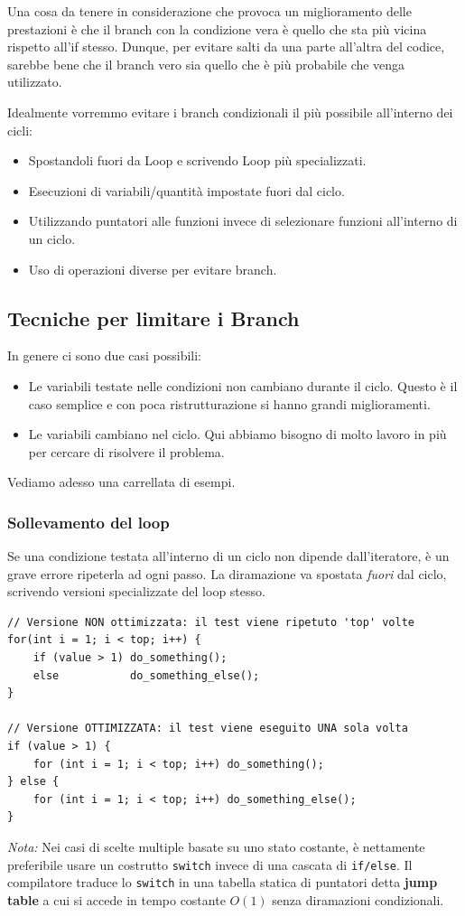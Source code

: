 Una cosa da tenere in considerazione che provoca un miglioramento delle prestazioni è che il branch con la condizione vera è quello che sta più vicina rispetto all'if stesso. Dunque, per evitare salti da una parte all'altra del codice, sarebbe bene che il branch vero sia quello che è più probabile che venga utilizzato.

Idealmente vorremmo evitare i branch condizionali il più 
possibile all'interno dei cicli:
\begin{itemize}
    \item Spostandoli fuori da Loop e scrivendo Loop più specializzati.
    \item Esecuzioni di variabili/quantità impostate fuori dal ciclo.
    \item Utilizzando puntatori alle funzioni invece di selezionare funzioni all'interno di un ciclo.
    \item Uso di operazioni diverse per evitare branch.
\end{itemize}
\subsection{Tecniche per limitare i Branch}
In genere ci sono due casi possibili:
\begin{itemize}
    \item Le variabili testate nelle condizioni non cambiano durante il ciclo. Questo è il caso semplice e con poca ristrutturazione si hanno grandi miglioramenti.
    \item Le variabili cambiano nel ciclo. Qui abbiamo bisogno di molto lavoro in più per cercare di risolvere il problema.
\end{itemize}
Vediamo adesso una carrellata di esempi.
\subsubsection*{Sollevamento del loop}
Se una condizione testata all'interno di un ciclo non dipende dall'iteratore, è un grave errore ripeterla ad ogni passo. La diramazione va spostata \textit{fuori} dal ciclo, scrivendo versioni specializzate del loop stesso.
\begin{framed}
\footnotesize    
\begin{verbatim}
// Versione NON ottimizzata: il test viene ripetuto 'top' volte
for(int i = 1; i < top; i++) {
    if (value > 1) do_something();
    else           do_something_else(); 
}

// Versione OTTIMIZZATA: il test viene eseguito UNA sola volta
if (value > 1) {
    for (int i = 1; i < top; i++) do_something();
} else {
    for (int i = 1; i < top; i++) do_something_else(); 
}
\end{verbatim}

\vspace{0.3cm}
\noindent
\textit{Nota:} Nei casi di scelte multiple basate su uno stato costante, è nettamente preferibile usare un costrutto \texttt{switch} invece di una cascata di \texttt{if/else}. Il compilatore traduce lo \texttt{switch} in una tabella statica di puntatori detta \textbf{jump table} a cui si accede in tempo costante $O(1)$ senza diramazioni condizionali.
\end{framed}
